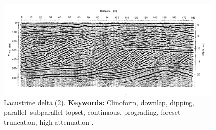 \begin{figure}[h!]
    \centering
    \includegraphics[width=0.9\linewidth]{Figures/0.2GPR/Jol1991_2_1.png}
    \caption[Lacustrine delta (2).]{Lacustrine delta (2). \textbf{Keywords: } Clinoform, downlap, dipping, parallel, subparallel topset, continuous, prograding, foreset truncation, high attenuation \citep{Jol1991-1}.}
    \label{fig:Jol1991-2-1}
\end{figure}